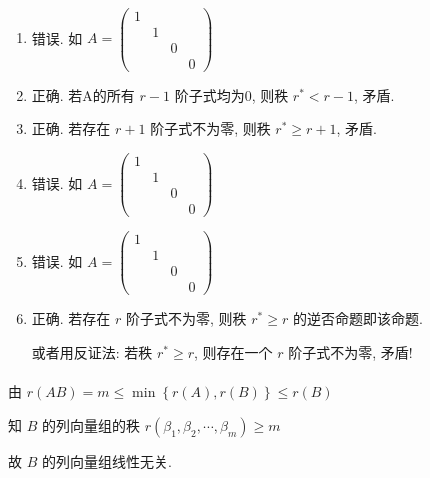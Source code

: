 	 \paragraph{} %
		 \begin{enumerate}
			 \item %
			       错误. 如 \( A = \begin{pmatrix}
				       1 &   &   &   \\
				         & 1 &   &   \\
				         &   & 0     \\
				         &   &   & 0
			       \end{pmatrix} \)
			 \item %
			       正确. 若A的所有 \(r-1\) 阶子式均为0, 则秩 \( r^{*} < r - 1 \), 矛盾.
			 \item %
			       正确. 若存在 \(r+1\) 阶子式不为零, 则秩 \( r^{*} \geq r + 1 \), 矛盾.
			 \item %
			       错误. 如 \( A = \begin{pmatrix}
				       1 &   &   &   \\
				         & 1 &   &   \\
				         &   & 0     \\
				         &   &   & 0
			       \end{pmatrix} \)
			 \item %
			       错误. 如 \( A = \begin{pmatrix}
				       1 &   &   &   \\
				         & 1 &   &   \\
				         &   & 0     \\
				         &   &   & 0
			       \end{pmatrix} \)
			 \item %
			       正确. 若存在 \(r\) 阶子式不为零, 则秩 \( r^{*} \geq r \) 的逆否命题即该命题.

			       或者用反证法: 若秩 \( r^{*} \geq r \), 则存在一个 \(r\) 阶子式不为零, 矛盾!
		 \end{enumerate}


	 \paragraph{} %
		 由 \( r(AB) = m \leq \min\left\{ r(A), r(B) \right\} \leq r(B) \)

		 知 \(B\) 的列向量组的秩 \( r(\beta_{1}, \beta_{2}, \cdots, \beta_{m}) \geq m \)

		 故 \(B\) 的列向量组线性无关.



